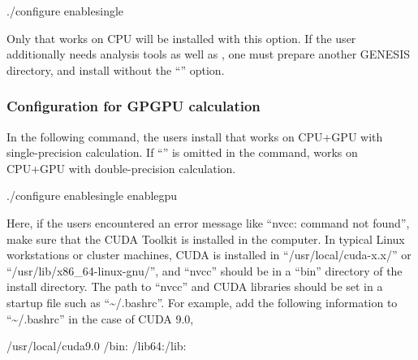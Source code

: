 \documentclass[a4paper,11pt,oneside,english]{sphinxmanual}
\begin{document}
\begin{sphinxVerbatim}[commandchars=\\\{\}]
\PYGZdl{} ./configure \PYGZhy{}\PYGZhy{}enable\PYGZhy{}single
\end{sphinxVerbatim}

Only  that works on CPU will be installed with this option.
If the user additionally needs analysis tools as well as ,
one must prepare another GENESIS directory, and install without the “” option.


\subsubsection{Configuration for GPGPU calculation}
\label{\detokenize{01_Getting_Started:configuration-for-gpgpu-calculation}}
In the following command, the users install  that works on CPU+GPU with single-precision calculation.
If “” is omitted in the command,  works on CPU+GPU with double-precision calculation.

\begin{sphinxVerbatim}[commandchars=\\\{\}]
\PYGZdl{} ./configure \PYGZhy{}\PYGZhy{}enable\PYGZhy{}single \PYGZhy{}\PYGZhy{}enable\PYGZhy{}gpu
\end{sphinxVerbatim}

Here, if the users encountered an error message like “nvcc: command not found”,
make sure that the CUDA Toolkit is installed in the computer.
In typical Linux workstations or cluster machines,
CUDA is installed in “/usr/local/cuda-x.x/” or “/usr/lib/x86\_64-linux-gnu/”,
and “nvcc” should be in a “bin” directory of the install directory.
The path to “nvcc” and CUDA libraries should be set in a startup file
such as “\textasciitilde{}/.bashrc”.  For example, add the following information to “\textasciitilde{}/.bashrc”
in the case of CUDA 9.0,

\begin{sphinxVerbatim}[commandchars=\\\{\}]
/usr/local/cuda\PYGZhy{}9.0
 /bin:
 /lib64:/lib:
\end{sphinxVerbatim}
\end{document}
